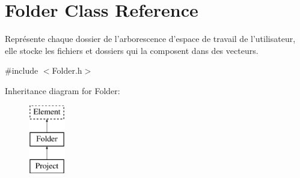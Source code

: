 \hypertarget{class_folder}{
\section{Folder Class Reference}
\label{class_folder}
}


Représente chaque dossier de l'arborescence d'espace de travail de l'utilisateur, elle stocke les fichiers et dossiers qui la composent dans des vecteurs.  




{\ttfamily \#include $<$Folder.h$>$}

Inheritance diagram for Folder:\begin{figure}[H]
\begin{center}
\leavevmode
\includegraphics[height=3.000000cm]{class_folder}
\end{center}
\end{figure}
